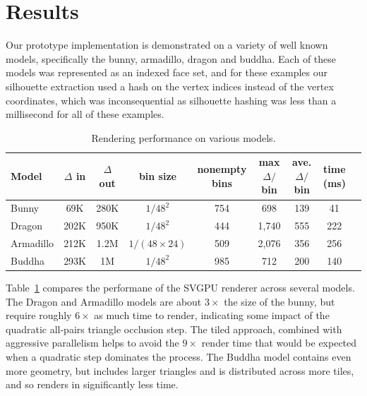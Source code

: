 \documentclass[review]{acmsiggraph}
\begin{document}

\section{Results} \label{sec:results}
Our prototype implementation is demonstrated on a variety of well known models,
specifically the bunny, armadillo, dragon and buddha. Each of these models was
represented as an indexed face set, and for these examples our silhouette
extraction used a hash on the vertex indices instead of the vertex
coordinates, which was inconsequential as silhouette hashing was less than a
millisecond for all of these examples.

\begin{table} \centering
\begin{tabular}{|l|c|c|c|c|c|c|c|c|} \hline
\bf Model & \bf $\Delta$ in & \bf $\Delta$ out & \bf bin size & \bf nonempty
bins & \bf max $\Delta/$bin & \bf ave. $\Delta/$bin & \bf time (ms) \\
\hline
Bunny & 69K & 280K & $1/48^2$ & 754 & 698 & 139 & 41 \\ 
Dragon & 202K & 950K & $1/48^2$ & 444 & 1,740 & 555 & 222 \\
Armadillo & 212K & 1.2M & $1/(48\times 24)$ & 509 & 2,076 & 356 & 256 \\
Buddha & 293K & 1M & $1/48^2$ & 985 & 712 & 200 & 140 \\ \hline
\end{tabular}
\caption{Rendering performance on various models.}
\label{tab:modelperf}
\end{table}

Table~\ref{tab:modelperf} compares the performane of the SVGPU renderer
across several models. The Dragon and Armadillo models are about $3\times$ the
size of the bunny, but require roughly $6\times$ as much time to render,
indicating some impact of the quadratic all-pairs triangle occlusion step. The
tiled approach, combined with aggressive parallelism helps to avoid the
$9\times$ render time that would be expected when a quadratic step dominates
the process. The Buddha model contains even more geometry, but includes larger
triangles and is distributed across more tiles, and so renders in
significantly less time.
\end{document}
